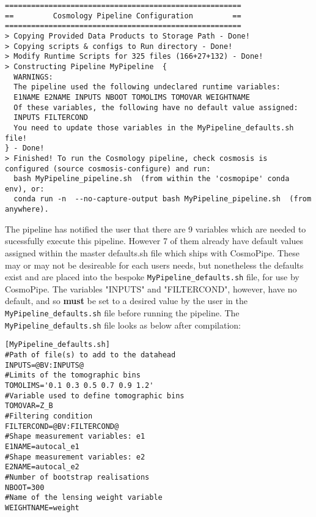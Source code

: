\documentclass[fleqn,usenatbib]{mnras}
\begin{document}
\begin{verbatim} 
======================================================
==         Cosmology Pipeline Configuration         ==
======================================================
> Copying Provided Data Products to Storage Path - Done!
> Copying scripts & configs to Run directory - Done!
> Modify Runtime Scripts for 325 files (166+27+132) - Done!
> Constructing Pipeline MyPipeline  {
  WARNINGS:
  The pipeline used the following undeclared runtime variables:
  E1NAME E2NAME INPUTS NBOOT TOMOLIMS TOMOVAR WEIGHTNAME
  Of these variables, the following have no default value assigned:
  INPUTS FILTERCOND 
  You need to update those variables in the MyPipeline_defaults.sh file!
} - Done!
> Finished! To run the Cosmology pipeline, check cosmosis is configured (source cosmosis-configure) and run:
  bash MyPipeline_pipeline.sh  (from within the 'cosmopipe' conda env), or:
  conda run -n  --no-capture-output bash MyPipeline_pipeline.sh  (from anywhere).
\end{verbatim}
The pipeline has notified the user that there are 9 variables which are needed to sucessfully execute this pipeline. 
However 7 of them already have default values assigned within the master defaults.sh file which ships with CosmoPipe. 
These may or may not be desireable for each users needs, but nonetheless the defaults exist and are placed into the 
bespoke \texttt{MyPipeline\_defaults.sh} file, for use by CosmoPipe. The variables "INPUTS" and "FILTERCOND", however, 
have no default, and so \textbf{must} be set to a desired value by the user in the \texttt{MyPipeline\_defaults.sh} file 
before running the pipeline. The  \texttt{MyPipeline\_defaults.sh} file looks as below after compilation: 

\begin{verbatim}[MyPipeline_defaults.sh]
#Path of file(s) to add to the datahead
INPUTS=@BV:INPUTS@
#Limits of the tomographic bins
TOMOLIMS='0.1 0.3 0.5 0.7 0.9 1.2'
#Variable used to define tomographic bins
TOMOVAR=Z_B
#Filtering condition
FILTERCOND=@BV:FILTERCOND@
#Shape measurement variables: e1
E1NAME=autocal_e1
#Shape measurement variables: e2
E2NAME=autocal_e2
#Number of bootstrap realisations
NBOOT=300
#Name of the lensing weight variable
WEIGHTNAME=weight
\end{verbatim}
\end{document}

